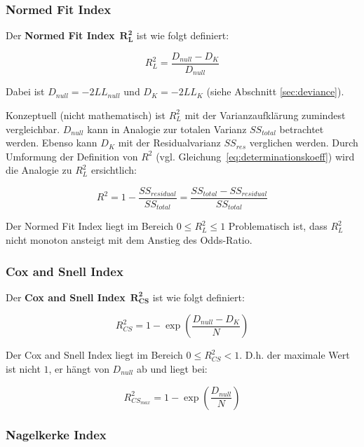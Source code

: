 \documentclass{article}
\numberwithin{equation}{section}
\begin{document}
\subsubsection{Normed Fit Index}
\label{sec:normed-fit-index}

Der \textbf{Normed Fit Index}~$\mathbf{R^2_L}$ ist wie folgt definiert:

\begin{equation}
R^2_L = \frac{D_{null}-D_K}{D_{null}}
\end{equation}

Dabei ist $D_{null} = -2LL_{null}$ und $D_K = -2LL_K$ (siehe Abschnitt \ref{sec:deviance}).

Konzeptuell (nicht mathematisch) ist $R^2_L$ mit der Varianzaufklärung zumindest vergleichbar. $D_{null}$ kann in Analogie zur totalen Varianz $SS_{total}$ betrachtet werden. Ebenso kann $D_K$ mit der Residualvarianz $SS_{res}$ verglichen werden. Durch Umformung der Definition von $R^2$ (vgl. Gleichung~\ref{eq:determinationskoeff}) wird die Analogie zu $R^2_L$ ersichtlich:

\begin{equation}
R^2 = 1 - \frac{SS_{residual}}{SS_{total}} = \frac{SS_{total}-SS_{residual}}{SS_{total}}
\end{equation}

Der Normed Fit Index liegt im Bereich $0 \le R^2_L \le 1$ Problematisch ist, dass $R^2_L$ nicht monoton ansteigt mit dem Anstieg des Odds-Ratio. 

\subsubsection{Cox and Snell Index}

Der \textbf{Cox and Snell Index}~$\mathbf{R^2_{CS}}$ ist wie folgt definiert:

\begin{equation}
R^2_{CS} = 1 - \exp \left( \frac{D_{null} - D_K}{N} \right)
\end{equation}

Der Cox and Snell Index liegt im Bereich $0 \le R^2_{CS} < 1$. D.h. der maximale Wert ist nicht $1$, er hängt von $D_{null}$ ab und liegt bei:

\begin{equation}
R^2_{CS_{max}} = 1 - \exp \left( \frac{D_{null}}{N} \right)
\end{equation}

\subsubsection{Nagelkerke Index}
\end{document}
